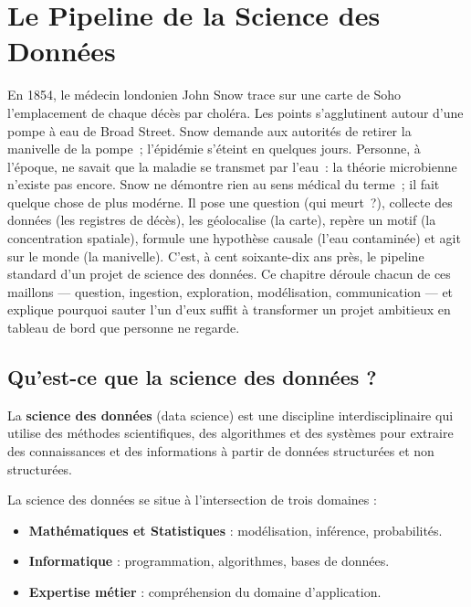 \chapter{Le Pipeline de la Science des Donn\'ees}
\label{ch:pipeline}

En 1854, le m\'edecin londonien John Snow trace sur une carte de Soho l'emplacement de chaque d\'ec\`es par chol\'era. Les points s'agglutinent autour d'une pompe \`a eau de Broad Street. Snow demande aux autorit\'es de retirer la manivelle de la pompe~; l'\'epid\'emie s'\'eteint en quelques jours. Personne, \`a l'\'epoque, ne savait que la maladie se transmet par l'eau~: la th\'eorie microbienne n'existe pas encore. Snow ne d\'emontre rien au sens m\'edical du terme~; il fait quelque chose de plus mod\'erne. Il pose une question (\og{}qui meurt~?\fg{}), collecte des donn\'ees (les registres de d\'ec\`es), les g\'eolocalise (la carte), rep\`ere un motif (la concentration spatiale), formule une hypoth\`ese causale (l'eau contamin\'ee) et agit sur le monde (la manivelle). C'est, \`a cent soixante-dix ans pr\`es, le pipeline standard d'un projet de science des donn\'ees. Ce chapitre d\'eroule chacun de ces maillons --- question, ingestion, exploration, mod\'elisation, communication --- et explique pourquoi sauter l'un d'eux suffit \`a transformer un projet ambitieux en tableau de bord que personne ne regarde.

\section{Qu'est-ce que la science des donn\'ees ?}

\begin{definition}
La \textbf{science des donn\'ees} (data science) est une discipline interdisciplinaire qui utilise des m\'ethodes scientifiques, des algorithmes et des syst\`emes pour extraire des connaissances et des informations \`a partir de donn\'ees structur\'ees et non structur\'ees.
\end{definition}

\begin{intuition}
La science des donn\'ees se situe \`a l'intersection de trois domaines :
\begin{itemize}
\item \textbf{Math\'ematiques et Statistiques} : mod\'elisation, inf\'erence, probabilit\'es.
\item \textbf{Informatique} : programmation, algorithmes, bases de donn\'ees.
\item \textbf{Expertise m\'etier} : compr\'ehension du domaine d'application.
\end{itemize}
\end{intuition}

